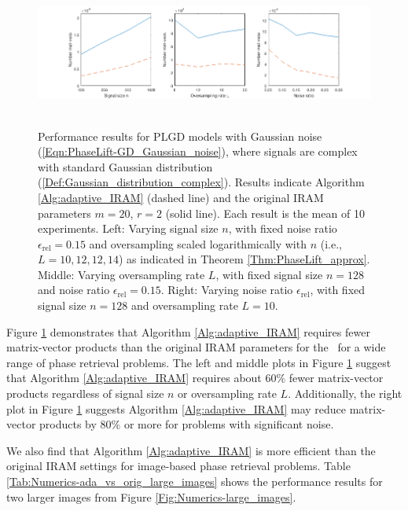 \begin{figure}[H]
\centering
\hbox{\hspace{-1.1cm} 
	\includegraphics[scale=0.6]{Numerics-ada_vs_orig_various_params}
			}
	\vspace{0.0cm}
	\caption{
	Performance results for PLGD models with Gaussian noise (\ref{Eqn:PhaseLift-GD_Gaussian_noise}), where signals are complex with standard Gaussian distribution (\ref{Def:Gaussian_distribution_complex}).
	Results indicate Algorithm \ref{Alg:adaptive_IRAM} (dashed line) and the original IRAM parameters $m=20$, $r = 2$ (solid line). 
	Each result is the mean of 10 experiments.
	Left: Varying signal size $n$, with fixed noise ratio $\epsilon_\text{rel} = 0.15$ and oversampling scaled logarithmically with $n$ (i.e., $L = 10, 12, 12, 14$) as indicated in Theorem \ref{Thm:PhaseLift_approx}.
	Middle: Varying oversampling rate $L$, with fixed signal size $n = 128$ and noise ratio $\epsilon_\text{rel} = 0.15$.
	Right: Varying noise ratio $\epsilon_\text{rel}$, with fixed signal size $n = 128$ and oversampling rate $L = 10$.
	}
\label{Fig:Numerics-ada_vs_orig_various_params}
\end{figure}

Figure \ref{Fig:Numerics-ada_vs_orig_various_params} demonstrates that Algorithm \ref{Alg:adaptive_IRAM} requires fewer matrix-vector products than the original IRAM parameters for the \emep \ for a wide range of phase retrieval problems.
The left and middle plots in Figure \ref{Fig:Numerics-ada_vs_orig_various_params} suggest that Algorithm \ref{Alg:adaptive_IRAM} requires about $60\%$ fewer matrix-vector products regardless of signal size $n$ or oversampling rate $L$.
Additionally, the right plot in Figure \ref{Fig:Numerics-ada_vs_orig_various_params} suggests Algorithm \ref{Alg:adaptive_IRAM} may reduce matrix-vector products by $80\%$ or more for problems with significant noise.


We also find that Algorithm \ref{Alg:adaptive_IRAM} is more efficient than the original IRAM settings for image-based phase retrieval problems.
Table \ref{Tab:Numerics-ada_vs_orig_large_images} shows the performance results for two larger images from Figure \ref{Fig:Numerics-large_images}.



